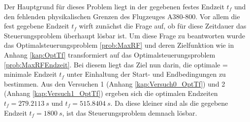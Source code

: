 Der Hauptgrund für dieses Problem liegt in der gegebenen festes Endzeit $t_f$ und den fehlenden physikalischen Grenzen des Flugzeuges A380-800. Vor allem die fest gegebene Endzeit $t_f$ wirft zunächst die Frage auf, ob für diese Zeitdauer das Steuerungsproblem überhaupt lösbar ist. Um diese Frage zu beantworten wurde das Optimalsteuerungsproblem \ref{prob:MaxRF} und deren Zielfunktion wie in Anhang \ref{kap:OptTf} transformiert auf das Optimalsteuerungsproblem \ref{prob:MaxRFEndzeit}. Bei diesem liegt das Ziel nun darin, die optimale = minimale Endzeit $t_f$ unter Einhaltung der Start- und Endbedingungen zu bestimmen. Aus den Versuchen 1 (Anhang \ref{kap:Versuch0_OptTf}) und 2 (Anhang \ref{kap:Versuch1_OptTf}) ergeben sich die optimalen Endzeiten $t_f = 279.2113 \ s$ und $t_f = 515.8404 \ s$. Da diese kleiner sind als die gegebene Endzeit $t_f = 1800 \ s$, ist das Steuerungsproblem demnach lösbar.

